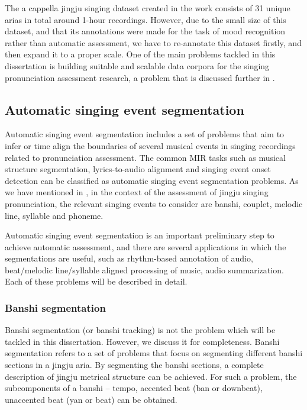The a cappella jingju singing dataset created in the work \cite{black_automatic_2014} consists of 31 unique arias in total around 1-hour recordings. However, due to the small size of this dataset, and that its annotations were made for the task of mood recognition rather than automatic assessment, we have to re-annotate this dataset firstly, and then expand it to a proper scale. One of the main problems tackled in this dissertation is building suitable and scalable data corpora for the singing pronunciation assessment research, a problem that is discussed further in . 

\subsection{Automatic singing event segmentation}

Automatic singing event segmentation includes a set of problems that aim to infer or time align the boundaries of several musical events in singing recordings related to pronunciation assessment. The common MIR tasks such as musical structure segmentation, lyrics-to-audio alignment and singing event onset detection can be classified as automatic singing event segmentation problems. As we have mentioned in , in the context of the assessment of jingju singing pronunciation, the relevant singing events to consider are banshi, couplet, melodic line, syllable and phoneme. 

Automatic singing event segmentation is an important preliminary step to achieve automatic assessment, and there are several applications in which the segmentations are useful, such as rhythm-based annotation of audio, beat/melodic line/syllable aligned processing of music, audio summarization. Each of these problems will be described in detail.

\subsubsection{Banshi segmentation}

Banshi segmentation (or banshi tracking) is not the problem which will be tackled in this dissertation. However, we discuss it for completeness. Banshi segmentation refers to a set of problems that focus on segmenting different banshi sections in a jingju aria. By segmenting the banshi sections, a complete description of jingju metrical structure can be achieved. For such a problem, the subcomponents of a banshi -- tempo, accented beat (ban or downbeat), unaccented beat (yan or beat) can be obtained.


